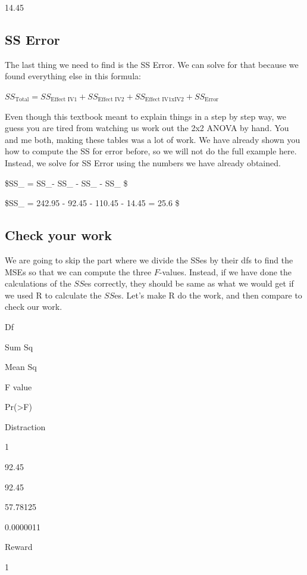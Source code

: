 \documentclass[]{book}
\begin{document}
14.45

\hypertarget{ss-error}{%
\subsection{SS Error}\label{ss-error}}

The last thing we need to find is the SS Error. We can solve for that because we found everything else in this formula:

\(SS_\text{Total} = SS_\text{Effect IV1} + SS_\text{Effect IV2} + SS_\text{Effect IV1xIV2} + SS_\text{Error}\)

Even though this textbook meant to explain things in a step by step way, we guess you are tired from watching us work out the 2x2 ANOVA by hand. You and me both, making these tables was a lot of work. We have already shown you how to compute the SS for error before, so we will not do the full example here. Instead, we solve for SS Error using the numbers we have already obtained.

\$SS\_ = SS\_- SS\_ - SS\_ - SS\_ \$

\$SS\_ = 242.95 - 92.45 - 110.45 - 14.45 = 25.6 \$

\hypertarget{check-your-work}{%
\subsection{Check your work}\label{check-your-work}}

We are going to skip the part where we divide the SSes by their dfs to find the MSEs so that we can compute the three \(F\)-values. Instead, if we have done the calculations of the \(SS\)es correctly, they should be same as what we would get if we used R to calculate the \(SS\)es. Let's make R do the work, and then compare to check our work.

Df

Sum Sq

Mean Sq

F value

Pr(\textgreater{}F)

Distraction

1

92.45

92.45

57.78125

0.0000011

Reward

1
\end{document}
